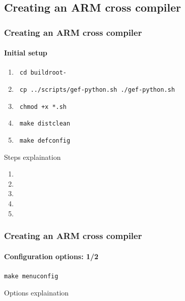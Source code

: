 \subsection{Creating an ARM cross compiler}
\begin{frame}
  \frametitle{Creating an ARM cross compiler}
  \framesubtitle{Initial setup}

  \begin{enumerate}
    \item \texttt{ cd buildroot-\buildrootLatestVersion }
    \item \texttt{ cp ../scripts/gef-python.sh ./gef-python.sh }
    \item \texttt{ chmod +x *.sh }
    \item \texttt{ make distclean }
    \item \texttt{ make defconfig }
  \end{enumerate}

\end{frame}
 {
  Steps explaination
  \begin{enumerate}
    \item \enteringBuildRootDirectoryDescription
    \item \gefPythonDescription
    \item \scriptShouldBeExecutableDescription
    \item \makeCleanDescription
    \item \makeDefConfigDescription
  \end{enumerate}
}

\begin{frame}
  \frametitle{Creating an ARM cross compiler}
  \framesubtitle{Configuration options: 1/2}
  \texttt{make menuconfig}
  \begin{itemize}
    \targetOptionsList
    \buildOptionsList
  \end{itemize}
\end{frame}
 {
  Options explaination \\
  \targetOptionsDescription \\
  \buildOptionsDescription
}

